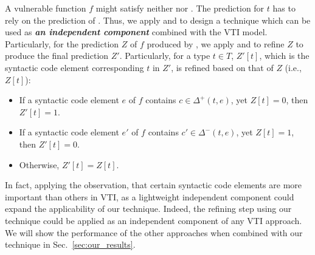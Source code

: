 A vulnerable function $f$ might satisfy neither \rp nor \rn. The prediction for $t$ has to rely on the prediction of \base. Thus, we apply \rp and \rn to design a technique which can be used as \textit{\textbf{an independent component}} combined with the VTI model. Particularly, for the prediction $Z$ of $f$ produced by \base, we apply \rp and \rn to refine $Z$ to produce the final prediction $Z'$. Particularly, for a type $t \in T$, $Z'[t]$, which is the syntactic code element corresponding $t$ in $Z'$, is refined based on that of $Z$ (i.e., $Z[t]$):
\begin{itemize}
    \item If a syntactic code element $e$ of $f$ contains $c \in \Delta^+(t, e)$, yet $Z[t] = 0$, then $Z'[t] = 1$.
    \item If a syntactic code element $e'$ of $f$ contains $c' \in \Delta^-(t, e)$, yet $Z[t] = 1$, then $Z'[t] = 0$.
    \item Otherwise, $Z'[t] = Z[t]$.
\end{itemize}

In fact, applying the observation, that certain syntactic code elements are more important than others in VTI, as a lightweight independent component could expand the applicability of our technique.
%
Indeed, the refining step using our technique could be applied as an independent component of any VTI approach. 
%
%
We will show the performance of the other approaches when combined with our technique in Sec.~\ref{sec:our_results}. 

